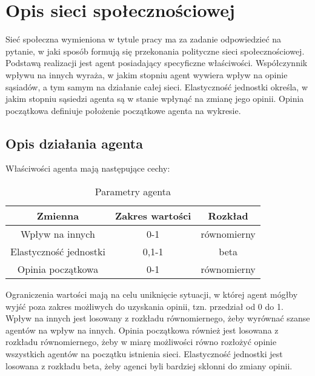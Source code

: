 \section{Opis sieci społecznościowej}
Sieć społeczna wymieniona w tytule pracy ma za zadanie odpowiedzieć na pytanie, w jaki sposób formują się przekonania polityczne sieci społecznościowej.
Podstawą realizacji jest agent posiadający specyficzne właściwości.
Współczynnik wpływu na innych wyraża, w jakim stopniu agent wywiera wpływ na opinie sąsiadów, a tym samym na działanie całej sieci.
Elastyczność jednostki określa, w jakim stopniu sąsiedzi agenta są w stanie wpłynąć na zmianę jego opinii.
Opinia początkowa definiuje położenie początkowe agenta na wykresie.

\subsection{Opis działania agenta}
Właściwości agenta mają następujące cechy:
\begin{table}[htbp]
    \centering
    \begin{tabular}{c|c|c}
        \hline
        Zmienna                & Zakres wartości & Rozkład     \\
        \hline
        Wpływ na innych        & 0-1             & równomierny \\
        Elastyczność jednostki & 0,1-1           & beta        \\
        Opinia początkowa      & 0-1             & równomierny \\
    \end{tabular}
    \caption{Parametry agenta}
    \label{tab:agent_parameters}
\end{table}

Ograniczenia wartości mają na celu uniknięcie sytuacji, w której agent mógłby wyjść poza zakres możliwych do uzyskania opinii, tzn. przedział od 0 do 1.
Wpływ na innych jest losowany z rozkładu równomiernego, żeby wyrównać szanse agentów na wpływ na innych.
Opinia początkowa również jest losowana z rozkładu równomiernego, żeby w miarę możliwości równo rozłożyć opinie wszystkich agentów na początku istnienia sieci.
Elastyczność jednostki jest losowana z rozkładu beta, żeby agenci byli bardziej skłonni do zmiany opinii.